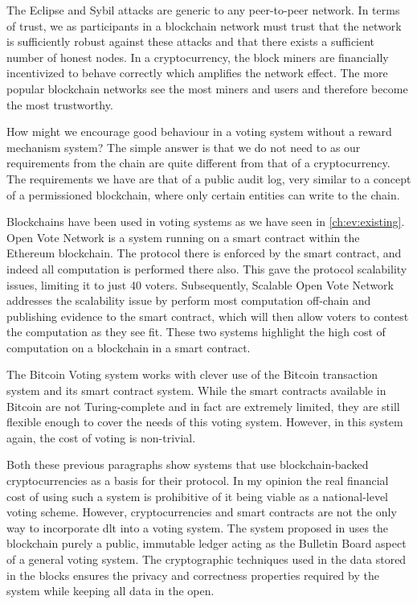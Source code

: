 The Eclipse and Sybil attacks are generic to any peer-to-peer network. In terms of trust, we as participants in a blockchain network must trust that the network is sufficiently robust against these attacks and that there exists a sufficient number of honest nodes. In a cryptocurrency, the block miners are financially incentivized to behave correctly which amplifies the network effect. The more popular blockchain networks see the most miners and users and therefore become the most trustworthy.

How might we encourage good behaviour in a voting system without a reward mechanism system? The simple answer is that we do not need to as our requirements from the chain are quite different from that of a cryptocurrency. The requirements we have are that of a public audit log, very similar to a concept of a permissioned blockchain, where only certain entities can write to the chain.

Blockchains have been used in voting systems as we have seen in \autoref{ch:ev:existing}. Open Vote Network \cite{mccorrySmartContractBoardroom2017} is a system running on a smart contract within the Ethereum blockchain. The protocol there is enforced by the smart contract, and indeed all computation is performed there also. This gave the protocol scalability issues, limiting it to just 40 voters. Subsequently, Scalable Open Vote Network \cite{seifelnasrScalableOpenVoteNetwork2020} addresses the scalability issue by perform most computation off-chain and publishing evidence to the smart contract, which will then allow voters to contest the computation as they see fit. These two systems highlight the high cost of computation on a blockchain in a smart contract.

The Bitcoin Voting \cite{zhaoHowVotePrivately2016} system works with clever use of the Bitcoin transaction system and its smart contract system. While the smart contracts available in Bitcoin are not Turing-complete and in fact are extremely limited, they are still flexible enough to cover the needs of this voting system. However, in this system again, the cost of voting is non-trivial.

Both these previous paragraphs show systems that use blockchain-backed cryptocurrencies as a basis for their protocol. In my opinion the real financial cost of using such a system is prohibitive of it being viable as a national-level voting scheme. However, cryptocurrencies and smart contracts are not the only way to incorporate \gls{dlt} into a voting system. The system proposed in \cite{yangBlockchainVotingPublicly2020} uses the blockchain purely a public, immutable ledger acting as the Bulletin Board aspect of a general voting system. The cryptographic techniques used in the data stored in the blocks ensures the privacy and correctness properties required by the system while keeping all data in the open.
